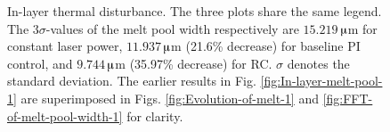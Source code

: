 \documentclass [11pt, proquest] {uwthesis}[2020/02/24]
\begin{document}
\begin{figure}[ht]
\begin{centering}
{\begin{centering}
\par\end{centering}
}
\par\end{centering}
\begin{centering}
\par\end{centering}
\centering{}\caption{\label{fig:In-layer-melt-pool}In-layer thermal disturbance. The three
plots share the same legend. The $3\sigma$-values of the melt pool
width respectively are $15.219\,$$\muup$m for constant laser power,
$11.937\,$$\muup$m (21.6\% decrease) for baseline PI control, and
$9.744\,$$\muup$m (35.97\% decrease) for RC. $\sigma$ denotes the
standard deviation. The earlier results in Fig. \ref{fig:In-layer-melt-pool-1}
are superimposed in Figs. \ref{fig:Evolution-of-melt-1} and \ref{fig:FFT-of-melt-pool-width-1}
for clarity.}
\end{figure}
\end{document}

